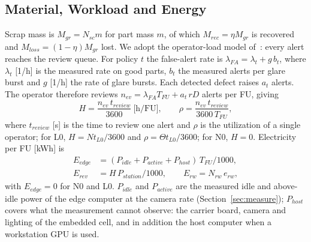 \subsection{Material, Workload and Energy}
Scrap mass is $M_{gr}=N_{sc}m$ for part mass $m$, of which $M_{rec}=\eta M_{gr}$ is recovered and $M_{loss}=(1-\eta)M_{gr}$ lost. We adopt the operator-load model of~\cite{sengar2026paperA}: every alert reaches the review queue. For policy $t$ the false-alert rate is $\lambda_{FA}=\lambda_t+g\,b_t$, where $\lambda_t$ [1/h] is the measured rate on good parts, $b_t$ the measured alerts per glare burst and $g$ [1/h] the rate of glare bursts. Each detected defect raises $a_t$ alerts. The operator therefore reviews $n_{ev}=\lambda_{FA}T_{FU}+a_t\,rD$ alerts per FU, giving
\begin{equation}
H = \frac{n_{ev}\, t_{review}}{3600}\ \text{[h/FU]}, \qquad \rho = \frac{n_{ev}\, t_{review}}{3600\, T_{FU}},
\end{equation}
where $t_{review}$ [s] is the time to review one alert and $\rho$ is the utilization of a single operator; for L0, $H=N t_{L0}/3600$ and $\rho=\Theta t_{L0}/3600$; for N0, $H=0$. Electricity per FU [kWh] is
\begin{align}
E_{edge} &= (P_{idle}+P_{active}+P_{host})\,T_{FU}/1000, \\
E_{rev} &= H\,P_{station}/1000, \qquad E_{rw} = N_{rw}\,e_{rw},
\end{align}
with $E_{edge}=0$ for N0 and L0. $P_{idle}$ and $P_{active}$ are the measured idle and above-idle power of the edge computer at the camera rate (Section~\ref{sec:measure}); $P_{host}$ covers what the measurement cannot observe: the carrier board, camera and lighting of the embedded cell, and in addition the host computer when a workstation GPU is used.

